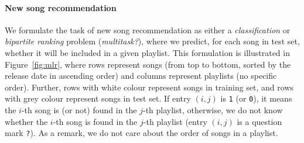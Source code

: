 \paragraph{New song recommendation}

We formulate the task of new song recommendation as either a \emph{classification} or \emph{bipartite ranking} problem ({\it multitask?}),
where we predict, for each song in test set,
whether it will be included in a given playlist.
This formulation is illustrated in Figure~\ref{fig:mlr},
where rows represent songs (from top to bottom, sorted by the release date in ascending order)
and columns represent playlists (no specific order).
Further, rows with white colour represent songs in training set, and rows with grey colour represent songs in test set.
If entry $(i, j)$ is \texttt{1} (or \texttt{0}), it means the $i$-th song is (or not) found in the $j$-th playlist,
otherwise, we do not know whether the $i$-th song is found in the $j$-th playlist (\ie entry $(i, j)$ is a question mark \texttt{?}).
As a remark, we do not care about the order of songs in a playlist.


